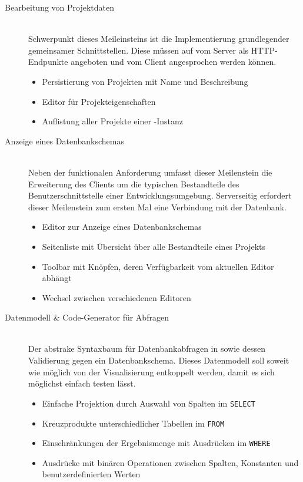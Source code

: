 \begin{description}
\item[Bearbeitung von Projektdaten] \hfill \\
  Schwerpunkt dieses Meileinsteins ist die Implementierung grundlegender gemeinsamer Schnittstellen. Diese müssen auf vom Server als HTTP-Endpunkte angeboten und vom Client angesprochen werden können.
  \begin{itemize}
  \item Persistierung von Projekten mit Name und Beschreibung
  \item Editor für Projekteigenschaften
  \item Auflistung aller Projekte einer \idename-Instanz
  \end{itemize}
\item [Anzeige eines Datenbankschemas] \hfill \\
  Neben der funktionalen Anforderung umfasst dieser Meilenstein die Erweiterung des Clients um die typischen Bestandteile des Benutzerschnittstelle einer Entwicklungsumgebung. Serverseitig erfordert dieser Meilenstein zum ersten Mal eine Verbindung mit der Datenbank.
  \begin{itemize}
  \item Editor zur Anzeige eines Datenbankschemas
  \item Seitenliste mit Übersicht über alle Bestandteile eines Projekts
  \item Toolbar mit Knöpfen, deren Verfügbarkeit vom aktuellen Editor abhängt
  \item Wechsel zwischen verschiedenen Editoren
  \end{itemize}
\item [Datenmodell \& Code-Generator für Abfragen] \hfill \\
  Der abstrake Syntaxbaum für Datenbankabfragen in \idename sowie dessen Validierung gegen ein Datenbankschema. Dieses Datenmodell soll soweit wie möglich von der Visualisierung entkoppelt werden, damit es sich möglichst einfach testen lässt.
  \begin{itemize}
  \item Einfache Projektion durch Auswahl von Spalten im \texttt{SELECT}
  \item Kreuzprodukte unterschiedlicher Tabellen im \texttt{FROM}
  \item Einschränkungen der Ergebnismenge mit Ausdrücken im \texttt{WHERE}
  \item Ausdrücke mit binären Operationen zwischen Spalten, Konstanten und benutzerdefinierten Werten

\end{itemize}
\end{description}
